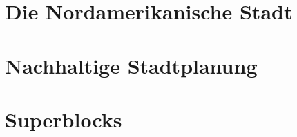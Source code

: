 \chapter{Die Nordamerikanische Stadt}
\newpage

\chapter{Nachhaltige Stadtplanung}
\newpage

\chapter{Superblocks}
\newpage

\listoffigures
\listoftables
\printglossaries

